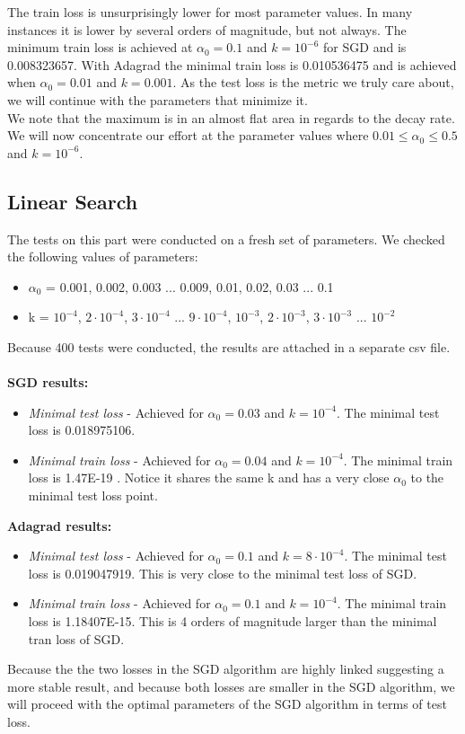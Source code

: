 \documentclass[12pt]{scrartcl}
\begin{document}
The train loss is unsurprisingly lower for most parameter values. In many instances it is lower by several orders of magnitude, but not always. The minimum train loss is achieved at $\alpha_0=0.1$ and $k=10^{-6}$ for SGD and is 0.008323657. With Adagrad the minimal train loss is 0.010536475 and is achieved when $\alpha_0 = 0.01$ and $k=0.001$. As the test loss is the metric we truly care about, we will continue with the parameters that minimize it.\\

We note that the maximum is in an almost flat area in regards to the decay rate. We will now concentrate our effort at the parameter values where $0.01 \leq \alpha_0 \leq 0.5$ and $k = 10^{-6}$.

\subsection{Linear Search}
The tests on this part were conducted on a fresh set of parameters. We checked the following values of parameters:
\begin{itemize}
\item $\alpha_0$ = 0.001, 0.002, 0.003 ... 0.009, 0.01, 0.02, 0.03 ... 0.1
\item k = $10^{-4}$, $2 \cdot 10^{-4}$, $3 \cdot 10^{-4}$ ... $9 \cdot 10^{-4}$, $10^{-3}$, $2 \cdot 10^{-3}$, $3 \cdot 10^{-3}$ ... $10^{-2}$
\end{itemize}

Because 400 tests were conducted, the results are attached in a separate csv file.\\\\
\textbf{SGD results:}
\begin{itemize}
\item \textit{Minimal test loss} - Achieved for $\alpha_0 = 0.03$ and $k=10^{-4}$. The minimal test loss is 0.018975106.
\item \textit{Minimal train loss} - Achieved for $\alpha_0 = 0.04$ and $k=10^{-4}$. The minimal train loss is 1.47E-19
. Notice it shares the same k and has a very close $\alpha_0$ to the minimal test loss point.
\end{itemize}

\textbf{Adagrad results:}
\begin{itemize}
\item \textit{Minimal test loss} - Achieved for $\alpha_0 = 0.1$ and $k=8\cdot 10^{-4}$. The minimal test loss is 0.019047919. This is very close to the minimal test loss of SGD.
\item \textit{Minimal train loss} - Achieved for $\alpha_0 = 0.1$ and $k=10^{-4}$. The minimal train loss is 1.18407E-15. This is 4 orders of magnitude larger than the minimal tran loss of SGD.
\end{itemize}
Because the the two losses in the SGD algorithm are highly linked suggesting a more stable result, and because both losses are smaller in the SGD algorithm, we will proceed with the optimal parameters of the SGD algorithm in terms of test loss.
\end{document}
